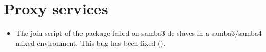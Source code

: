 %


\section{Proxy services}
\begin{itemize}
\item The join script of the package  failed
on samba3 dc slaves in a samba3/samba4 mixed environment. This bug has been
fixed ().
\end{itemize}


%



